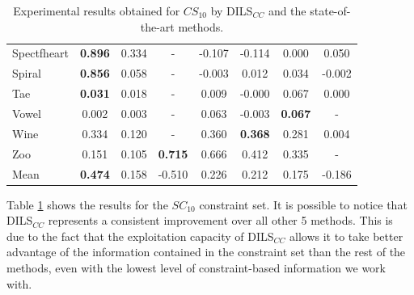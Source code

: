 \documentclass[review]{elsarticle}
\begin{document}
\begin{table}[!h]
{\begin{tabular}{lccccccc}
			Spectfheart & \textbf{0.896} & 0.334 & - & -0.107 & -0.114 & 0.000 & 0.050 \\
			Spiral & \textbf{0.856} & 0.058 & - & -0.003 & 0.012 & 0.034 & -0.002 \\
			Tae & \textbf{0.031} & 0.018 & - & 0.009 & -0.000 & 0.067 & 0.000 \\
			Vowel & 0.002 & 0.003 & - & 0.063 & -0.003 & \textbf{0.067} & - \\
			Wine & 0.334 & 0.120 & - & 0.360 & \textbf{0.368} & 0.281 & 0.004 \\
			Zoo & 0.151 & 0.105 & \textbf{0.715} & 0.666 & 0.412 & 0.335 & - \\
			\hline
			Mean & \textbf{0.474} & 0.158 & -0.510 & 0.226 & 0.212 & 0.175 & -0.186 \\
			\hline
			
		\end{tabular}}
		
	\caption{Experimental results obtained for $CS_{10}$ by DILS$_{CC}$ and the state-of-the-art methods.}
	\label{tab:results10}
\end{table}

Table \ref{tab:results10} shows the results for the $SC_{10}$ constraint set. It is possible to notice that DILS$_{CC}$ represents a consistent improvement over all other 5 methods. This is due to the fact that the exploitation capacity of DILS$_{CC}$ allows it to take better advantage of the information contained in the constraint set than the rest of the methods, even with the lowest level of constraint-based information we work with.
\end{document}
